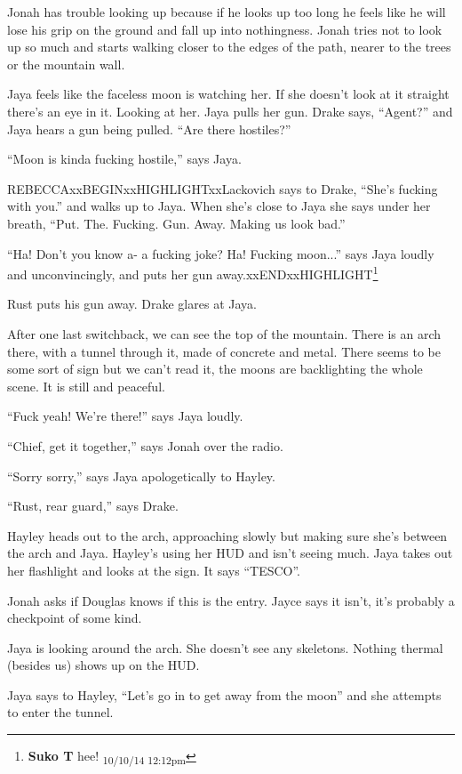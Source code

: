 Jonah has trouble looking up because if he looks up too long he feels like he will lose his grip on the ground and fall up into nothingness.  Jonah tries not to look up so much and starts walking closer to the edges of the path, nearer to the trees or the mountain wall.



Jaya feels like the faceless moon is watching her.  If she doesn't look at it straight there's an eye in it.  Looking at her.  Jaya pulls her gun.  Drake says, ``Agent?'' and Jaya hears a gun being pulled.  ``Are there hostiles?''

``Moon is kinda fucking hostile,'' says Jaya.

REBECCAxxBEGINxxHIGHLIGHTxxLackovich says to Drake, ``She's fucking with you.'' and walks up to Jaya.  When she's close to Jaya she says under her breath, ``Put. The.  Fucking.  Gun.  Away.  Making us look bad.''

``Ha!  Don't you know a- a fucking joke?  Ha!  Fucking moon...'' says Jaya loudly and unconvincingly, and puts her gun away.xxENDxxHIGHLIGHT\footnote{\textbf{Suko T }hee! \textsubscript{10/10/14 12:12pm}}

Rust puts his gun away.  Drake glares at Jaya.



After one last switchback, we can see the top of the mountain.  There is an arch there, with a tunnel through it, made of concrete and metal.  There seems to be some sort of sign but we can't read it, the moons are backlighting the whole scene.  It is still and peaceful.

``Fuck yeah!  We're there!'' says Jaya loudly.

``Chief, get it together,'' says Jonah over the radio.

``Sorry sorry,'' says Jaya apologetically to Hayley.

``Rust, rear guard,'' says Drake.

Hayley heads out to the arch, approaching slowly but making sure she's between the arch and Jaya.  Hayley's using her HUD and isn't seeing much.  Jaya takes out her flashlight and looks at the sign.  It says ``TESCO''.  

Jonah asks if Douglas knows if this is the entry.   Jayce says it isn't, it's probably a checkpoint of some kind.  

Jaya is looking around the arch.  She doesn't see any skeletons.  Nothing thermal (besides us) shows up on the HUD.

Jaya says to Hayley, ``Let's go in to get away from the moon'' and she attempts to enter the tunnel.

